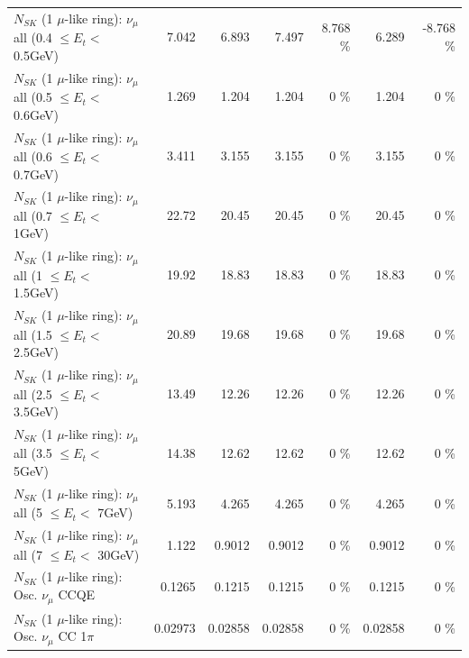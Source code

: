 \begin{table}
\begin{tabular}{| l | r | r | r  r | r  r |}
       $N_{SK}$ (1 $\mu$-like ring): $\nu_{\mu}$ all (0.4 $\leq E_{t} <$ 0.5GeV) &           7.042 &           6.893 &           7.497 &    8.768 \%  &           6.289 &   -8.768 \%  \\ 
       $N_{SK}$ (1 $\mu$-like ring): $\nu_{\mu}$ all (0.5 $\leq E_{t} <$ 0.6GeV) &           1.269 &           1.204 &           1.204 &        0 \%  &           1.204 &        0 \%  \\ 
       $N_{SK}$ (1 $\mu$-like ring): $\nu_{\mu}$ all (0.6 $\leq E_{t} <$ 0.7GeV) &           3.411 &           3.155 &           3.155 &        0 \%  &           3.155 &        0 \%  \\ 
         $N_{SK}$ (1 $\mu$-like ring): $\nu_{\mu}$ all (0.7 $\leq E_{t} <$ 1GeV) &           22.72 &           20.45 &           20.45 &        0 \%  &           20.45 &        0 \%  \\ 
         $N_{SK}$ (1 $\mu$-like ring): $\nu_{\mu}$ all (1 $\leq E_{t} <$ 1.5GeV) &           19.92 &           18.83 &           18.83 &        0 \%  &           18.83 &        0 \%  \\ 
       $N_{SK}$ (1 $\mu$-like ring): $\nu_{\mu}$ all (1.5 $\leq E_{t} <$ 2.5GeV) &           20.89 &           19.68 &           19.68 &        0 \%  &           19.68 &        0 \%  \\ 
       $N_{SK}$ (1 $\mu$-like ring): $\nu_{\mu}$ all (2.5 $\leq E_{t} <$ 3.5GeV) &           13.49 &           12.26 &           12.26 &        0 \%  &           12.26 &        0 \%  \\ 
         $N_{SK}$ (1 $\mu$-like ring): $\nu_{\mu}$ all (3.5 $\leq E_{t} <$ 5GeV) &           14.38 &           12.62 &           12.62 &        0 \%  &           12.62 &        0 \%  \\ 
           $N_{SK}$ (1 $\mu$-like ring): $\nu_{\mu}$ all (5 $\leq E_{t} <$ 7GeV) &           5.193 &           4.265 &           4.265 &        0 \%  &           4.265 &        0 \%  \\ 
          $N_{SK}$ (1 $\mu$-like ring): $\nu_{\mu}$ all (7 $\leq E_{t} <$ 30GeV) &           1.122 &          0.9012 &          0.9012 &        0 \%  &          0.9012 &        0 \%  \\ 
\hline
\hline
                               $N_{SK}$ (1 $\mu$-like ring): Osc. $\nu_\mu$ CCQE &          0.1265 &          0.1215 &          0.1215 &        0 \%  &          0.1215 &        0 \%  \\ 
                          $N_{SK}$ (1 $\mu$-like ring): Osc. $\nu_\mu$ CC 1$\pi$ &         0.02973 &         0.02858 &         0.02858 &        0 \%  &         0.02858 &        0 \%  \\ 

\end{tabular}
\end{table}
